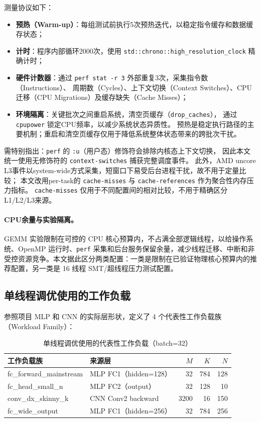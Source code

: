 \documentclass[a4paper,11pt,oneside]{article}
\begin{document}
测量协议如下：
\begin{itemize}
    \item \textbf{预热（Warm-up）}：每组测试前执行5次预热迭代，以稳定指令缓存和数据缓存状态；
    \item \textbf{计时}：程序内部循环2000次，使用 \texttt{std::chrono::high\_resolution\_clock} 精确计时；
    \item \textbf{硬件计数器}：通过 \texttt{perf stat -r 3} 外部重复3次，采集指令数（Instructions）、
          周期数（Cycles）、上下文切换（Context Switches）、CPU迁移（CPU Migrations）及缓存缺失（Cache Misses）；
    \item \textbf{环境隔离}：关键批次之间重启系统，清空页缓存（\texttt{drop\_caches}），
          通过 \texttt{cpupower} 锁定CPU频率，以减少系统状态异质性。
          预热是稳定执行路径的主要机制；重启和清空页缓存仅用于降低系统整体状态带来的跨批次干扰。
\end{itemize}

需特别指出：\texttt{perf} 的 \texttt{:u}（用户态）修饰符会排除内核态上下文切换，
因此本文统一使用无修饰符的 \texttt{context-switches} 捕获完整调度事件。
此外，AMD uncore L3事件以system-wide方式采集，短窗口下易受后台进程干扰，故不用于定量比较；
本文改用per-task的 \texttt{cache-misses} 与 \texttt{cache-references} 作为聚合性内存压力指标。
\texttt{cache-misses} 仅用于不同配置间的相对比较，不用于精确区分L1/L2/L3来源。

\paragraph{CPU余量与实验隔离。}
GEMM 实验限制在可控的 CPU 核心预算内，不占满全部逻辑线程，以给操作系统、OpenMP 运行时、\texttt{perf} 采集和后台服务保留余量，减少线程迁移、中断和非受控资源竞争。本文据此区分两类配置：一类是限制在已验证物理核心预算内的推荐配置，另一类是 16 线程 SMT/超线程压力测试配置。

\subsection{单线程调优使用的工作负载}

参照项目 MLP 和 CNN 的实际层形状，定义了 4 个代表性工作负载族（Workload Family）：

\begin{table}[H]
\centering
\begin{tabular}{llrrr}
\toprule
\textbf{工作负载族} & \textbf{来源层} & $M$ & $K$ & $N$ \\
\midrule
fc\_forward\_mainstream & MLP FC1（hidden=128） & 32 & 784 & 128 \\
fc\_head\_small\_n      & MLP FC2（output）      & 32 & 128 & 10  \\
conv\_dx\_skinny\_k     & CNN Conv2 backward     & 3200 & 16 & 150 \\
fc\_wide\_output        & MLP FC1（hidden=256）  & 32 & 784 & 256 \\
\bottomrule
\end{tabular}
\caption{单线程调优使用的代表性工作负载（batch=32）}
\label{tab:tuning_workloads}
\end{table}
\end{document}
